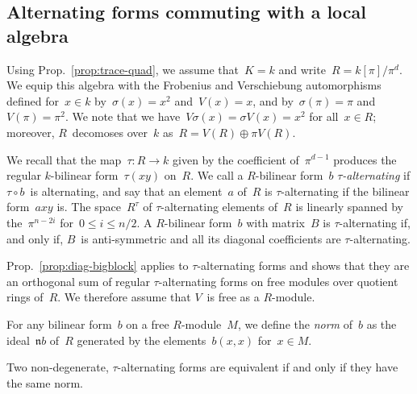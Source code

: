 \documentclass{article}%
\let\fr\mathfrak
\begin{document}
\subsection{Alternating forms commuting with a local algebra}%

Using Prop.~\ref{prop:trace-quad},
we assume that~$K = k$ and write~$R = k[π] / π^d$.
We equip this algebra with the Frobenius and Verschiebung automorphisms
defined for~$x ∈ k$ by~$σ(x) = x^2$ and~$V(x) = x$,
and by~$σ(π) = π$ and~$V(π) = π^2$.
We note that we have~$V σ(x) = σ V(x) = x^2$ for all~$x ∈ R$; moreover,
$R$~decomoses over~$k$ as~$R = V(R) ⊕ π V(R)$.

We recall that the map~$τ: R → k$ given by the coefficient of~$π^{d-1}$
produces the regular $k$-bilinear form~$τ(x y)$ on~$R$.
We call a $R$-bilinear form~$b$ \emph{$τ$-alternating} if $τ ∘ b$~is
alternating, and say that an element~$a$ of~$R$ is $τ$-alternating if the
bilinear form~$a x y$ is.
The space~$R^{τ}$ of $τ$-alternating elements of~$R$ is linearly spanned
by the~$π^{n-2i}$ for~$0 ≤ i ≤ n/2$.
A $R$-bilinear form~$b$ with matrix~$B$ is $τ$-alternating if, and only if,
$B$~is anti-symmetric and all its diagonal coefficients are $τ$-alternating.

Prop.~\ref{prop:diag-bigblock} applies to $τ$-alternating forms and shows
that they are an orthogonal sum of regular $τ$-alternating forms on free
modules over quotient rings of~$R$. We therefore assume that $V$~is free
as a $R$-module.

For any bilinear form~$b$ on a free $R$-module~$M$, we define the
\emph{norm} of~$b$ as the ideal~$\fr{n} b$ of~$R$
generated by the elements~$b(x, x)$ for~$x ∈ M$.

\begin{prop}\label{prop:eqv-norm}
Two non-degenerate, $τ$-alternating forms are equivalent if and only
if they have the same norm.
\end{prop}
\end{document}
